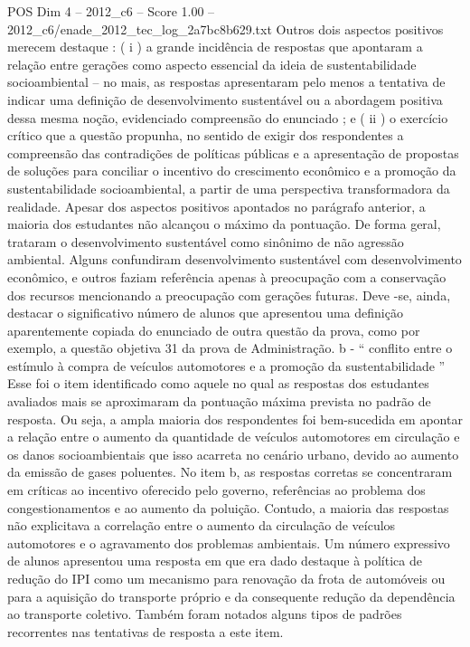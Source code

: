 \begin{textsample}{POS Dim 4 – 2012\_c6 – Score 1.00 – 2012\_c6/enade\_2012\_tec\_log\_2a7bc8b629.txt}
Outros dois aspectos positivos merecem destaque : ( i ) a grande incidência de respostas que apontaram a relação entre gerações como aspecto essencial da ideia de sustentabilidade socioambiental – no mais, as respostas apresentaram pelo menos a tentativa de indicar uma definição de desenvolvimento sustentável ou a abordagem positiva dessa mesma noção, evidenciado compreensão do enunciado ; e ( ii ) o exercício crítico que a questão propunha, no sentido de exigir dos respondentes a compreensão das contradições de políticas públicas e a apresentação de propostas de soluções para conciliar o incentivo do crescimento econômico e a promoção da sustentabilidade socioambiental, a partir de uma perspectiva transformadora da realidade.
Apesar dos aspectos positivos apontados no parágrafo anterior, a maioria dos estudantes não alcançou o máximo da pontuação.
De forma geral, trataram o desenvolvimento sustentável como sinônimo de não agressão ambiental.
Alguns confundiram desenvolvimento sustentável com desenvolvimento econômico, e outros faziam referência apenas à preocupação com a conservação dos recursos mencionando a preocupação com gerações futuras.
Deve -se, ainda, destacar o significativo número de alunos que apresentou uma definição aparentemente copiada do enunciado de outra questão da prova, como por exemplo, a questão objetiva 31 da prova de Administração. b - “ conflito entre o estímulo à compra de veículos automotores e a promoção da sustentabilidade ” Esse foi o item identificado como aquele no qual as respostas dos estudantes avaliados mais se aproximaram da pontuação máxima prevista no padrão de resposta.
Ou seja, a ampla maioria dos respondentes foi bem-sucedida em apontar a relação entre o aumento da quantidade de veículos automotores em circulação e os danos socioambientais que isso acarreta no cenário urbano, devido ao aumento da emissão de gases poluentes.
No item b, as respostas corretas se concentraram em críticas ao incentivo oferecido pelo governo, referências ao problema dos congestionamentos e ao aumento da poluição.
Contudo, a maioria das respostas não explicitava a correlação entre o aumento da circulação de veículos automotores e o agravamento dos problemas ambientais.
Um número expressivo de alunos apresentou uma resposta em que era dado destaque à política de redução do IPI como um mecanismo para renovação da frota de automóveis ou para a aquisição do transporte próprio e da consequente redução da dependência ao transporte coletivo.
Também foram notados alguns tipos de padrões recorrentes nas tentativas de resposta a este item.

\end{textsample}
